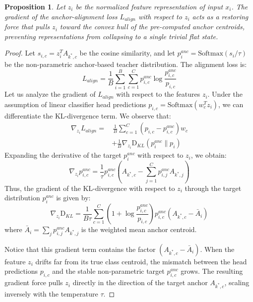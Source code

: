 \documentclass{article}
\theoremstyle{plain}
\newtheorem{proposition}[theorem]{Proposition}
\theoremstyle{definition}
\theoremstyle{remark}
\begin{document}
\begin{proposition}
\label{prop:gradient_bound}
Let $z_i$ be the normalized feature representation of input $x_i$. The gradient of the anchor-alignment loss $L_{align}$ with respect to $z_i$ acts as a restoring force that pulls $z_i$ toward the convex hull of the pre-computed anchor centroids, preventing representations from collapsing to a single trivial flat state.
\end{proposition}

\begin{proof}
Let $s_{i, c} = z_i^T A_{k^*, c}$ be the cosine similarity, and let $p_i^{anc} = \text{Softmax}(s_i / \tau)$ be the non-parametric anchor-based teacher distribution. The alignment loss is:
\begin{equation}
    L_{align} = \frac{1}{B} \sum_{i=1}^B \sum_{c=1}^C p_{i, c}^{anc} \log \frac{p_{i, c}^{anc}}{p_{i, c}}
\end{equation}
Let us analyze the gradient of $L_{align}$ with respect to the features $z_i$. Under the assumption of linear classifier head predictions $p_{i, c} = \text{Softmax}(w_c^T z_i)$, we can differentiate the KL-divergence term. We observe that:
\begin{equation}
\begin{split}
    \nabla_{z_i} L_{align} = & \, \frac{1}{B} \sum_{c=1}^C (p_{i, c} - p_{i, c}^{anc}) w_c \\
    & + \frac{1}{B} \nabla_{z_i} \text{D}_{KL}(p_i^{anc} \parallel p_i)
\end{split}
\end{equation}
Expanding the derivative of the target $p_i^{anc}$ with respect to $z_i$, we obtain:
\begin{equation}
    \nabla_{z_i} p_{i, c}^{anc} = \frac{1}{\tau} p_{i, c}^{anc} \left( A_{k^*, c} - \sum_{j=1}^C p_{i, j}^{anc} A_{k^*, j} \right)
\end{equation}
Thus, the gradient of the KL-divergence with respect to $z_i$ through the target distribution $p_i^{anc}$ is given by:
\begin{equation}
    \nabla_{z_i} \text{D}_{KL} = \frac{1}{B \tau} \sum_{c=1}^C \left( 1 + \log \frac{p_{i, c}^{anc}}{p_{i, c}} \right) p_{i, c}^{anc} \left( A_{k^*, c} - \bar{A}_i \right)
\end{equation}
where $\bar{A}_i = \sum_j p_{i, j}^{anc} A_{k^*, j}$ is the weighted mean anchor centroid. 

Notice that this gradient term contains the factor $(A_{k^*, c} - \bar{A}_i)$. When the feature $z_i$ drifts far from its true class centroid, the mismatch between the head predictions $p_{i, c}$ and the stable non-parametric target $p_{i, c}^{anc}$ grows. The resulting gradient force pulls $z_i$ directly in the direction of the target anchor $A_{k^*, c}$, scaling inversely with the temperature $\tau$.


\end{proof}
\end{document}
